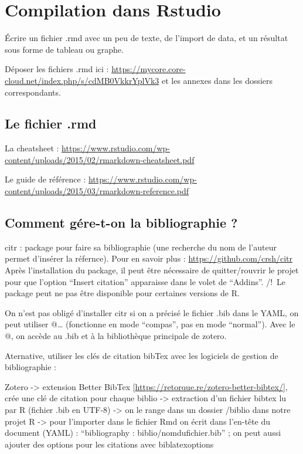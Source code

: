 \documentclass[
  12pt,
  american,
  a4paper,
  extrafontsizes,onecolumn,openright
  ]{memoir}
\begin{document}
\hypertarget{compilation-dans-rstudio}{%
\section{Compilation dans Rstudio}\label{compilation-dans-rstudio}}

Écrire un fichier .rmd avec un peu de texte, de l'import de data, et un résultat sous forme de tableau ou graphe.

Déposer les fichiers .rmd ici : \url{https://mycore.core-cloud.net/index.php/s/cdMB0VkkrYplVk3} et les annexes dans les dossiers correspondants.

\hypertarget{le-fichier-.rmd}{%
\subsection{Le fichier .rmd}\label{le-fichier-.rmd}}

La cheatsheet : \url{https://www.rstudio.com/wp-content/uploads/2015/02/rmarkdown-cheatsheet.pdf}

Le guide de référence : \url{https://www.rstudio.com/wp-content/uploads/2015/03/rmarkdown-reference.pdf}

\hypertarget{comment-guxe9re-t-on-la-bibliographie}{%
\subsection{Comment gére-t-on la bibliographie ?}\label{comment-guxe9re-t-on-la-bibliographie}}

citr : package pour faire sa bibliographie (une recherche du nom de l'auteur permet d'insérer la réfernce). Pour en savoir plus : \url{https://github.com/crsh/citr} Après l'installation du package, il peut être nécessaire de quitter/rouvrir le projet pour que l'option ``Insert citation'' apparaisse dans le volet de ``Addins''. /!~Le package peut ne pas être disponible pour certaines versions de R.

On n'est pas obligé d'installer citr si on a précisé le fichier .bib dans le YAML, on peut utiliser @\ldots{} (fonctionne en mode ``compas'', pas en mode ``normal''). Avec le @, on accède au .bib et à la bibliothèque principale de zotero.

Aternative, utiliser les clés de citation bibTex avec les logiciels de gestion de bibliographie :

Zotero -\textgreater{} extension Better BibTex {[}\url{https://retorque.re/zotero-better-bibtex/}{]}, crée une clé de citation pour chaque biblio -\textgreater{} extraction d'un fichier bibtex lu par R (fichier .bib en UTF-8) -\textgreater{} on le range dans un dossier /biblio dans notre projet R -\textgreater{} pour l'importer dans le fichier Rmd on écrit dans l'en-tête du document (YAML) : ``bibliography : biblio/nomdufichier.bib'' ; on peut aussi ajouter des options pour les citations avec biblatexoptions
\end{document}
